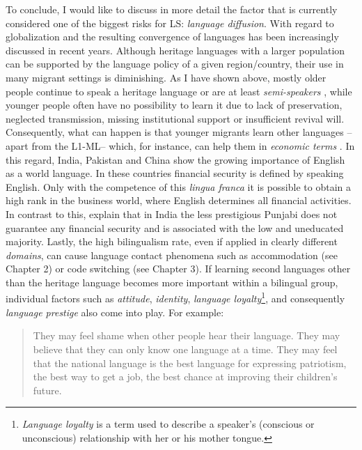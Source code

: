 \documentclass[output=paper,
modfonts
]{langscibook}
\begin{document}
To conclude, I would like to discuss in more detail the factor that is currently considered one of the biggest risks for LS: \emph{language diffusion}. With regard to globalization and the resulting convergence of languages has been increasingly discussed in recent years. Although heritage languages with a larger population can be supported by the language policy of a given region/country, their use in many migrant settings is diminishing. As I have shown above, mostly older people continue to speak a heritage language or are at least \emph{semi-speakers} \parencite{Dorian1980}, while younger people often have no possibility to learn it due to lack of preservation, neglected transmission, missing institutional support or insufficient revival will. Consequently, what can happen is that younger migrants learn other languages -- apart from the L1-ML-- which, for instance, can help them in \emph{economic terms} \parencite{Holmes2013}. In this regard, India, Pakistan and China show the growing importance of English as a world language. In these countries financial security is defined by speaking English. Only with the competence of this \emph{lingua franca} it is possible to obtain a high rank in the business world, where English determines all financial activities. In contrast to this, \cite[74]{Nawaz2012} explain that in India the less prestigious Punjabi does not guarantee any financial security and is
associated with the low and uneducated majority. Lastly, the high bilingualism rate, even if applied in clearly different \emph{domains}, can cause language contact phenomena such as accommodation (see Chapter 2)
or code switching (see Chapter 3).
If learning second languages other than the heritage language becomes more important within a bilingual group, individual factors such as \emph{attitude}, \emph{identity}, \emph{language loyalty}\footnote{\emph{Language loyalty} is a term used to describe a speaker's (conscious or unconscious) relationship with her or his mother tongue.}, and consequently \emph{language prestige} also come into play. For example:

\begin{quote}
They may feel shame when other people hear their language. They may believe that they can only know one language at a time. They may feel that the national language is the best language for expressing patriotism, the best way to get a job, the best chance at improving their children's future. \parencite{SIL}
\end{quote}
\end{document}
